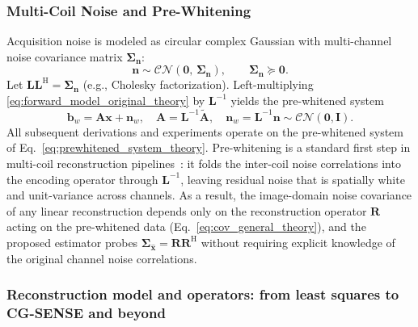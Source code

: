 \documentclass[AMA,STIX2COL,Linenumberson]{MRM}
\begin{document}
\subsubsection{Multi-Coil Noise and Pre-Whitening}
Acquisition noise is modeled as circular complex Gaussian with multi-channel noise covariance matrix
$\boldsymbol{\Sigma}_{\mathbf{n}}$:
\begin{equation}
\mathbf{n}\sim\mathcal{CN}\!\left(\mathbf{0},\,\boldsymbol{\Sigma}_{\mathbf{n}}\right),\qquad \boldsymbol{\Sigma}_{\mathbf{n}}\succeq \mathbf{0}.
\label{eq:input_noise_theory}
\end{equation}
Let $\mathbf{L}\mathbf{L}^{\mathrm{H}}=\boldsymbol{\Sigma}_{\mathbf{n}}$ (e.g., Cholesky factorization). Left-multiplying \eqref{eq:forward_model_original_theory} by $\mathbf{L}^{-1}$ yields the pre-whitened system
\begin{equation}
\mathbf{b}_w=\mathbf{A}\mathbf{x}+\mathbf{n}_w,\quad \mathbf{A}=\mathbf{L}^{-1}\widetilde{\mathbf{A}},\quad \mathbf{n}_w=\mathbf{L}^{-1}\mathbf{n}\sim\mathcal{CN}(\mathbf{0},\mathbf{I}).
\label{eq:prewhitened_system_theory}
\end{equation}
All subsequent derivations and experiments operate on the 
pre-whitened system of Eq.~\eqref{eq:prewhitened_system_theory}. 
Pre-whitening is a standard first step in multi-coil reconstruction pipelines~\cite{hansen2015image,pmr}: it folds the inter-coil noise correlations into the encoding operator through $\mathbf{L}^{-1}$, leaving residual noise that is spatially white and unit-variance across channels. As a result, the image-domain noise covariance of any linear reconstruction depends only on the reconstruction operator $\mathbf{R}$ acting on the pre-whitened data (Eq.~\eqref{eq:cov_general_theory}), and the proposed estimator probes $\boldsymbol{\Sigma}_{\hat{\mathbf{x}}} = \mathbf{R}\mathbf{R}^{\mathrm{H}}$ without requiring explicit knowledge of the original channel noise correlations.

\subsubsection{Reconstruction model and operators: from least squares to CG-SENSE and beyond}
\end{document}
